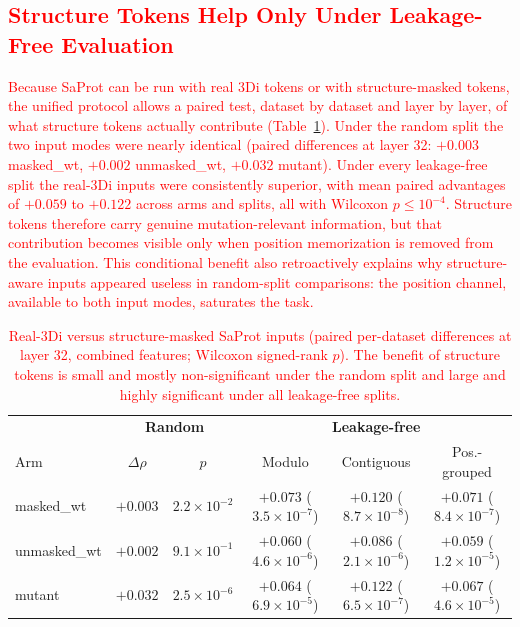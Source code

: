 \documentclass[numbered,webpdf,modern,large]{oup-authoring-template}
\newcommand{\rev}[1]{\textcolor{red}{#1}}
\begin{document}
\subsection{\rev{Structure Tokens Help Only Under Leakage-Free Evaluation}}

\rev{Because SaProt can be run with real 3Di tokens or with structure-masked
tokens, the unified protocol allows a paired test, dataset by dataset and layer by
layer, of what structure tokens actually contribute (Table~\ref{tab:3di}). Under the
random split the two input modes were nearly identical (paired differences at layer
32: $+0.003$ masked\_wt, $+0.002$ unmasked\_wt, $+0.032$ mutant). Under every
leakage-free split the real-3Di inputs were consistently superior, with mean paired
advantages of $+0.059$ to $+0.122$ across arms and splits, all with Wilcoxon
$p \leq 10^{-4}$. Structure tokens therefore carry genuine mutation-relevant
information, but that contribution becomes visible only when position memorization
is removed from the evaluation. This conditional benefit also retroactively
explains why structure-aware inputs appeared useless in random-split comparisons:
the position channel, available to both input modes, saturates the task.}

\begin{table}[ht]
\centering
\caption{\rev{Real-3Di versus structure-masked SaProt inputs (paired per-dataset
differences at layer 32, combined features; Wilcoxon signed-rank $p$). The benefit of
structure tokens is small and mostly non-significant under the random split and
large and highly significant under all leakage-free splits.}}
\label{tab:3di}
\begin{tabular}{lcc|ccc}
\toprule
& \multicolumn{2}{c|}{\textbf{Random}} & \multicolumn{3}{c}{\textbf{Leakage-free}} \\
Arm & $\Delta\rho$ & $p$ & Modulo & Contiguous & Pos.-grouped \\
\midrule
masked\_wt   & $+0.003$ & $2.2 \times 10^{-2}$ & $+0.073$ ($3.5 \times 10^{-7}$) & $+0.120$ ($8.7 \times 10^{-8}$) & $+0.071$ ($8.4 \times 10^{-7}$) \\
unmasked\_wt & $+0.002$ & $9.1 \times 10^{-1}$ & $+0.060$ ($4.6 \times 10^{-6}$) & $+0.086$ ($2.1 \times 10^{-6}$) & $+0.059$ ($1.2 \times 10^{-5}$) \\
mutant       & $+0.032$ & $2.5 \times 10^{-6}$ & $+0.064$ ($6.9 \times 10^{-5}$) & $+0.122$ ($6.5 \times 10^{-7}$) & $+0.067$ ($4.6 \times 10^{-5}$) \\
\bottomrule
\end{tabular}
\end{table}
\end{document}
